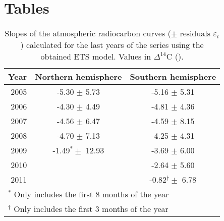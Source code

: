 \documentclass[a4paper, 11pt]{article}
\begin{document}
\clearpage

\section*{Tables}

\begin{table}[ht]
\centering \small 
\caption{Slopes of the atmospheric radiocarbon curves ($\pm$ residuals $\varepsilon_t$) calculated for the last years of the series using the obtained ETS model. Values in $\Delta^{14}$C (\permil).} \label{tab:slopes}
\begin{tabular}{rcc} 
  \toprule
Year & Northern hemisphere & Southern hemisphere \\ 
  \midrule
2005 & -5.30 $\pm$ 5.73 & -5.16 $\pm$ 5.31 \\ 
  2006 & -4.30 $\pm$ 4.49 & -4.81 $\pm$ 4.36 \\ 
  2007 & -4.56 $\pm$ 6.47 & -4.59 $\pm$ 8.15 \\ 
  2008 & -4.70 $\pm$ 7.13 & -4.25 $\pm$ 4.31 \\ 
  2009 & -1.49$^{\ast} \pm$ 12.93 & -3.69 $\pm$ 6.00 \\ 
  2010 &   & -2.64 $\pm$ 5.60 \\ 
  2011 &   & -0.82$^{\dagger} \pm$ 6.78 \\ 
   \bottomrule
   \multicolumn{3}{l}{$^{\ast}$ Only includes the first 8 months of the year} \\
   \multicolumn{3}{l}{$^{\dagger}$ Only includes the first 3 months of the year}
\end{tabular}
\end{table}
\end{document}
